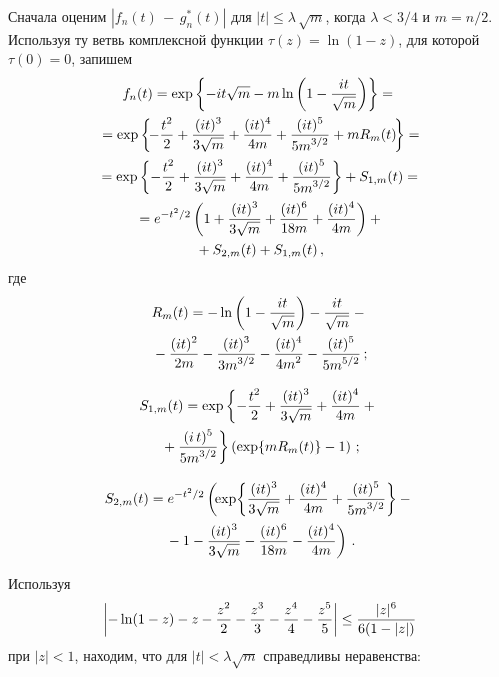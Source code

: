 \begin{multicols}{2}
Сначала оценим   $|f_n(t)\,-\,g^*_n(t)|$ для $|t| \le \lambda\,\sqrt{m}$, когда    $\lambda < 3/4$ и $m=n/2$.
Используя ту ветвь комплексной функции    $\tau(z)=\ln(1 - z)$, для которой
  $\tau(0) =0$, запишем
\begin{multline}
f_n(t)  =  \exp\left\{-it\sqrt{m}-m\ln\left(1-\fr{it}{\sqrt{m}}\right)\right\}={}\\
{}= \exp\left\{\!
-\fr{t^2}{2} +\fr{(it)^3}{3\sqrt{m}}+\fr{(it)^4}{4m}+ %
\fr{(it)^5}{5m^{3/2}}+mR_m(t)\!\right\}={}\hspace{-1.603pt}\\
{} = \exp\left\{-\fr{t^2}{2} +\fr{(it)^3}{3\sqrt{m}}+\fr{(it)^4}{4m}+
\fr{(it)^5}{5m^{3/2}}\right\}+S_{1,m}(t)={}\\
{} =  e^{-t^2/2}\left(1+\fr{(it)^3}{3\sqrt{m}}+\fr{(it)^6}{18m}+\fr{(it)^4}{4m} \right)+{}\\
{} +S_{2,m}(t)+S_{1,m}(t)\,,
\label{g7}
\end{multline}
где
\begin{multline*}
 R_m(t) =  -\ln\left(1-\fr{ it}{\sqrt{m}}\right) -\fr{ it}{ \sqrt{m}}-{}\\
 {}-\fr{(it)^2}{ 2m} -
\fr{ (it)^3}{ 3m^{3/2}}-\fr{ (it)^4}{ 4m^{2}}-\fr{ (it)^5}{ 5m^{5/2}}\,;
\end{multline*}

\vspace*{-12pt}

\begin{multline*}
S_{1,m}(t) = \exp\left\{-\fr{t^2}{2} +\fr{(it)^3}{3\sqrt{m}}+
\fr{(it)^4}{4m}+{}\right.\\
\left.{}+\fr{(i\,t)^5}{5m^{3/2}}\right\}\left(\exp\{mR_m(t)\}-1\right)\,;
\end{multline*} 

\vspace*{-12pt}

\noindent
\begin{multline*}
 S_{2,m}(t)=e^{-t^2/2}\left(\!\exp\!\left\{\fr{(it)^3}{3\sqrt{m}}+\fr{(it)^4}{4m} +
 \fr{ (it)^5}{ 5m^{3/2}}\right\}-{}\right.\hspace*{-0.5347pt}\\
\left.{}-1-\fr{(it)^3}{3\sqrt{m}}-\fr{(it)^6}{18m}-\fr{(it)^4}{4m}\right)\,.
\end{multline*}

Используя 
$$
\left| -\ln(1-z) -z -\fr{z^2}{2} - \fr{z^3}{3} - \fr{z^4}{4} - \fr{z^5}{5} \right| \leq \fr{|z|^6}{6(1-|z|)}
$$ 
при 
$|z| < 1$, находим, что для  $|t| < \lambda \sqrt{m}$ справедливы неравенства:


\end{multicols}
